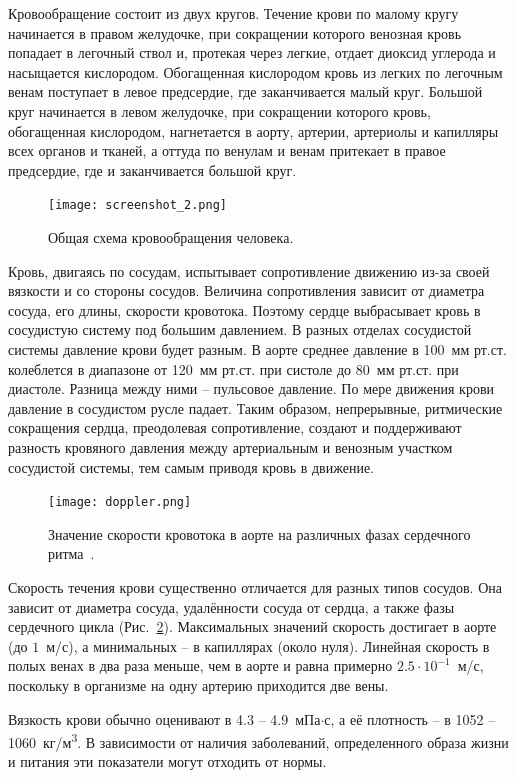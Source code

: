 Кровообращение состоит из двух кругов. Течение крови по малому кругу начинается в правом желудочке, при сокращении которого венозная кровь попадает в легочный ствол и, 
протекая через легкие, отдает диоксид углерода и насыщается кислородом. Обогащенная кислородом кровь из легких по легочным венам 
поступает в левое предсердие, где заканчивается малый круг. Большой круг начинается в левом желудочке, при сокращении которого кровь, 
обогащенная кислородом, нагнетается в аорту, артерии, артериолы и капилляры всех органов и тканей, а оттуда по венулам и венам 
притекает в правое предсердие, где и заканчивается большой круг.

\begin{figure}[h!]
    \centering
    \texttt{[image: screenshot\_2.png]}
    \caption{Общая схема кровообращения человека.}
    \label{tip}
    \end{figure}

Кровь, двигаясь по сосудам, испытывает сопротивление движению из-за своей вязкости и со стороны сосудов. 
Величина сопротивления зависит от диаметра сосуда, его длины, скорости кровотока. Поэтому сердце выбрасывает кровь 
в сосудистую систему под большим давлением. В разных отделах сосудистой системы давление крови будет разным. 
В аорте среднее давление в 100~мм рт.ст. колеблется в диапазоне от 120~мм рт.ст. при систоле до 80~мм рт.ст. при диастоле. 
Разница между ними -- пульсовое давление. По мере движения крови давление в сосудистом русле падает. Таким образом, непрерывные, 
ритмические сокращения сердца, преодолевая сопротивление, создают и поддерживают разность кровяного давления между артериальным и 
венозным участком сосудистой системы, тем самым приводя кровь в движение.


\begin{figure}[h!]
    \centering
    \texttt{[image: doppler.png]}
    \caption{Значение скорости кровотока в аорте на различных фазах сердечного ритма~\cite{Azhim18}.}
    \label{velosit}
    \end{figure}
Скорость течения крови существенно отличается для разных типов сосудов. Она зависит от диаметра сосуда, удалённости сосуда от сердца,
а также фазы сердечного цикла (Рис.~\ref{velosit}). Максимальных значений скорость достигает в аорте (до \texttilde$1$~м/с), а минимальных --
в капиллярах (около нуля).
Линейная скорость в полых венах в два раза меньше, 
чем в аорте и равна примерно $2.5\cdot10^{-1}$~м/с, поскольку в организме на одну артерию приходится две вены. 

Вязкость крови обычно оценивают в 4.3 -- 4.9~мПа$\cdot$с, а её плотность -- в 1052 -- 1060~кг/м\textsuperscript{3}. 
В зависимости от наличия заболеваний, определенного образа жизни и питания эти показатели могут отходить от нормы. 

